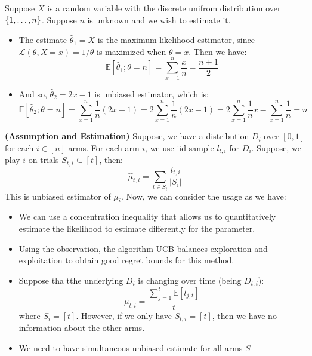 \begin{example}
    Suppose $X$ is a random variable with the discrete unifrom distribution over $\left\{ 1,\dots,n \right\}$. Suppose $n$ is unknown and we wish to estimate it. 
    \begin{itemize}
        \item The estimate $\hat{\theta}_1 = X$ is the maximum likelihood estimator, since $\mathcal{L}(\theta, X = x) = 1/\theta$ is maximized when $\theta = x$. Then we have:
        \begin{equation*}
            \mathbb{E}[\hat{\theta}_1 ; \theta = n] = \sum^n_{x=1}\frac{x}{n} = \frac{n+1}{2}
        \end{equation*}
        \item And so, $\hat{\theta}_2 = 2x - 1$ is unbiased estimator, which is:
        \begin{equation*}
            \mathbb{E}[\hat{\theta}_2 ; \theta = n] = \sum^n_{x=1}\frac{1}{n}(2x - 1) = 2\sum^n_{x=1} \frac{1}{n} (2x - 1) = 2\sum^n_{x=1}\frac{1}{n}x -\sum^n_{x=1}\frac{1}{n} = n
        \end{equation*}
    \end{itemize}
\end{example}

\begin{remark}{\textbf{(Assumption and Estimation)}}
    Suppose, we have a distribution $D_i$ over $[0, 1]$ for each $i\in[n]$ arms. For each arm $i$, we use iid sample $l_{t, i}$ for $D_i$. Suppose, we play $i$ on trials $S_{t, i}\subseteq[t]$, then:
    \begin{equation*}
        \hat{\mu}_{t, i} = \sum_{t\in S_i} \frac{l_{t, i}}{|S_i|}
    \end{equation*}
    This is unbiased estimator of $\mu_i$. Now, we can consider the usage as we have:
    \begin{itemize}
        \item We can use a concentration inequality that allows us to quantitatively estimate the likelihood to estimate differently for the parameter. 
        \item Using the observation, the algorithm UCB balances exploration and exploitation to obtain good regret bounds for this method. 
        \item Suppose tha tthe underlying $D_i$ is changing over time (being $D_{t, i}$):
        \begin{equation*}
            \mu_{t, i} = \frac{\sum^t_{j=1} \mathbb{E}[l_{j,t}]}{t}
        \end{equation*}
        where $S_i = [t]$. However, if we only have $S_{t, i} = [t]$, then we have no information about the other arms. 
        \item We need to have simultaneous unbiased estimate for all arms $S$
    \end{itemize}
\end{remark}

